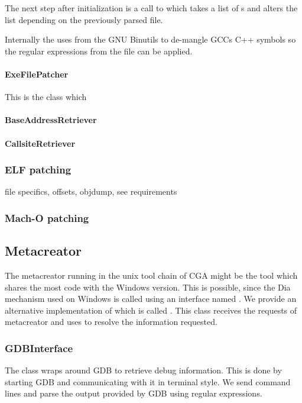 The next step after initialization is a call to  which takes a list of s and alters the list depending on the previously parsed file.

Internally the  uses  from the GNU Binutils to de-mangle GCCs C++ symbols so the regular expressions from the file can be applied.

\paragraph{ExeFilePatcher} This is the class which 

\paragraph{BaseAddressRetriever}

\paragraph{CallsiteRetriever}




\subsubsection{ELF patching} 

file specifics, offsets, objdump, see requirements


\subsubsection{Mach-O patching}




\subsection{Metacreator} The metacreator running in the unix tool chain of CGA might be the tool which shares the most code with the Windows version. This is possible, since the Dia mechanism used on Windows is called using an interface named . We provide an alternative implementation of  which is called . This class receives the requests of metacreator and uses  to resolve the information requested.

\subsubsection{GDBInterface} The  class wraps around GDB to retrieve debug information. This is done by starting GDB and communicating with it in terminal style. We send command lines and parse the output provided by GDB using regular expressions. 

